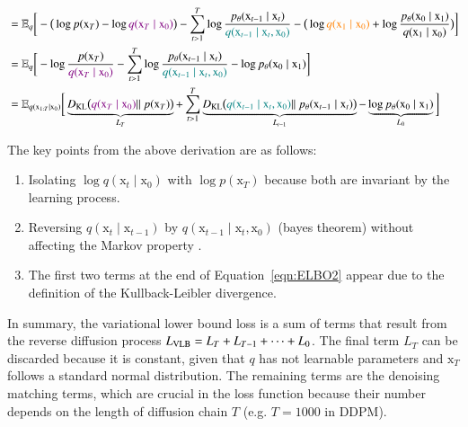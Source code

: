 \begin{equation}
\begin{split}
        & = \mathbb{E}_{q}\bigg[-\big(\log p(\mathrm{x}_{T}) - \log \textcolor{violet}{q(\mathrm{x}_{T}\mid\mathrm{x}_{0})}\big) - \sum_{t>1}^{T} \log \frac{p_{\theta}(\mathrm{x}_{t-1}\mid\mathrm{x}_{t})}{\textcolor{teal}{q(\mathrm{x}_{t-1}\mid\mathrm{x}_{t}, \mathrm{x}_{0})}} - \big( \log\textcolor{orange}{q(\mathrm{x}_{1}\mid\mathrm{x}_{0})}  +\log\frac{p_{\theta}(\mathrm{x}_{0}\mid\mathrm{x}_{1})}{q(\mathrm{x}_{1}\mid\mathrm{x}_{0})}\big)\bigg]  \\ 
        & = \mathbb{E}_{q}\bigg[-\log \frac{p(\mathrm{x}_{T})}{\textcolor{violet}{q(\mathrm{x}_{T}\mid\mathrm{x}_{0})}} - \sum_{t>1}^{T} \log \frac{p_{\theta}(\mathrm{x}_{t-1}\mid\mathrm{x}_{t})}{\textcolor{teal}{q(\mathrm{x}_{t-1}\mid\mathrm{x}_{t}, \mathrm{x}_{0})}} -  \log p_{\theta}(\mathrm{x}_{0}\mid\mathrm{x}_{1})\bigg]  \\
        & = \mathbb{E}_{q(\mathrm{x}_{1:T}\mid\mathrm{x}_{0})}\bigg[\underbrace{D_{\text{\scriptsize{KL}}}\big(\textcolor{violet}{q(\mathrm{x}_{T}\mid\mathrm{x}_{0})} ||~p(\mathrm{x}_{T}) \big)}_{L_{T}} + \sum_{t>1}^{T} \underbrace{D_{\text{\scriptsize{KL}}}\big( \textcolor{teal}{q(\mathrm{x}_{t-1}\mid\mathrm{x}_{t}, \mathrm{x}_{0})}||~p_{\theta}(\mathrm{x}_{t-1}\mid\mathrm{x}_{t}) \big)}_{L_{t-1}} -  \underbrace{\log p_{\theta}(\mathrm{x}_{0}\mid\mathrm{x}_{1})}_{L_{0}} \bigg]
    \end{split}
\end{equation}

\noindent The key points from the above derivation are as follows: 
\begin{enumerate}
    \item Isolating  $\log q(\mathrm{x}_{t}\mid\mathrm{x}_{0})$ with $\log p(\mathrm{x}_{T})$ because both are invariant by the learning process.
    \item Reversing $q(\mathrm{x}_{t}\mid\mathrm{x}_{t-1})$ by $q(\mathrm{x}_{t-1}\mid\mathrm{x}_{t}, \mathrm{x}_{0})$ (bayes theorem) without affecting the Markov property .
    \item The first two terms at the end of Equation~\ref{eqn:ELBO2} appear due to the definition of the Kullback-Leibler divergence. 
\end{enumerate}
    

\noindent In summary, the variational lower bound loss is a sum of terms that result from the reverse diffusion process $L_{\text{\scriptsize{\text{VLB}}}}=L_{T} + L_{T-1} + \dots + L_{0}$. The final term $L_{T}$ can be discarded because
it is constant, given that $q$ has not learnable parameters and $\mathrm{x}_{T}$ follows a standard normal distribution. The remaining terms are the denoising matching terms, which are crucial in the loss function because their number depends on the length of diffusion chain $T$ (e.g. $T=1000$ in DDPM).\\

